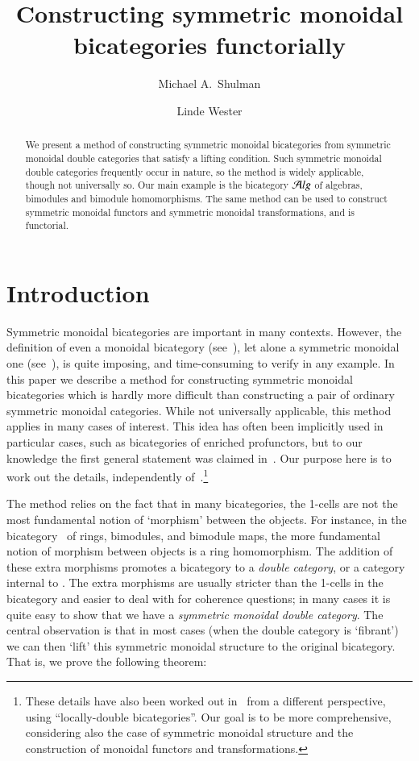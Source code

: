 \documentclass{amsart}
\title{Constructing symmetric monoidal bicategories functorially}
\author{Michael A.\ Shulman}
\author{Linde Wester}
\begin{document}
\maketitle

\begin{abstract}
  We present a method of constructing symmetric monoidal bicategories
  from symmetric monoidal double categories that satisfy a lifting
  condition. Such symmetric monoidal double categories frequently
  occur in nature, so the method is widely applicable, though not
  universally so. Our main example is the bicategory ${\mathcal{A}}lg$ of algebras, bimodules and bimodule homomorphisms. The same method can be used to construct symmetric monoidal functors and symmetric monoidal transformations, and is functorial.   
\end{abstract}


\section{Introduction}
\label{sec:introduction}

Symmetric monoidal bicategories are important in many contexts.
However, the definition of even a monoidal bicategory
(see~\cite{gps:tricats,nick:tricats}), let alone a symmetric monoidal
one
(see~\cite{kv:2cat-zam,kv:bm2cat,bn:hda-i,ds:monbi-hopfagbd,crans:centers,mccrudden:bal-coalgb,gurski:brmonbicat}),
is quite imposing, and time-consuming to verify in any example.  In
this paper we describe a method for constructing symmetric monoidal
bicategories which is hardly more difficult than constructing a pair
of ordinary symmetric monoidal categories.  While not universally
applicable, this method applies in many cases of interest.  This idea
has often been implicitly used in particular cases, such as
bicategories of enriched profunctors, but to our knowledge the first
general statement was claimed in~\cite[Appendix B]{shulman:frbi}.  Our
purpose here is to work out the details, independently
of~\cite{shulman:frbi}.\footnote{These details have also been worked out
in~\cite[\S5]{gg:ldstr-tricat} from a different perspective, using
``locally-double bicategories''.  Our goal is to be more
comprehensive, considering also the case of symmetric monoidal
structure and the construction of monoidal functors and
transformations.}

The method relies on the fact that in many bicategories, the 1-cells
are not the most fundamental notion of `morphism' between the objects.
For instance, in the bicategory \cMod\ of rings, bimodules, and
bimodule maps, the more fundamental notion of morphism between objects
is a ring homomorphism. The addition of these extra morphisms promotes
a bicategory to a \emph{double category}, or a category internal to
\cCat.  The extra morphisms are usually stricter than the 1-cells in
the bicategory and easier to deal with for coherence questions; in
many cases it is quite easy to show that we have a \emph{symmetric
  monoidal double category}.  The central observation is that in most
cases (when the double category is `fibrant') we can then `lift' this
symmetric monoidal structure to the original bicategory.  That is, we
prove the following theorem:
\end{document}
